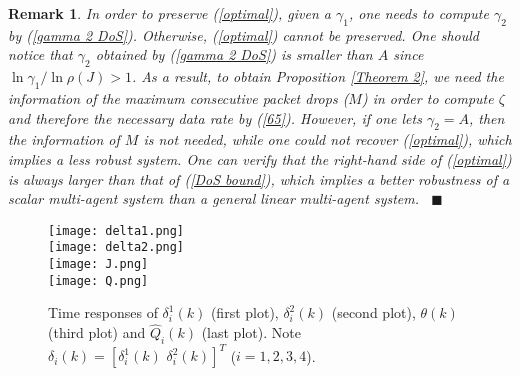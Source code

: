 \documentclass[letterpaper,journal,final,twocolumn]{IEEEtran}
\def\qedp{\hspace*{\fill}~{\tiny $\blacksquare$}}
\newtheorem{itremark}{Remark}
\newenvironment{remark}{\begin{itremark}\rm}{\end{itremark}}
\begin{document}
\begin{remark}\label{remark 3}
In order to preserve (\ref{optimal}), given a $\gamma_1$, one needs to compute $\gamma_2$ by (\ref{gamma 2 DoS}). Otherwise, (\ref{optimal}) cannot be preserved. One should notice that $\gamma_2$ obtained by (\ref{gamma 2 DoS}) is smaller than $A$ since $\ln \gamma_1/ \ln \rho(J)>1$. As a result, to obtain Proposition \ref{Theorem 2}, we need the information of the maximum consecutive packet drops ($M$) in order to compute $\zeta$ and therefore the necessary data rate by (\ref{65}). However, if one lets $\gamma_2=A$, then the information of $M$ is not needed, while one could not recover (\ref{optimal}), which implies a less robust system. 
One can verify that the right-hand side of (\ref{optimal}) is always larger than that of (\ref{DoS bound}), which implies a better robustness of a scalar multi-agent system than a general linear multi-agent system. 
\qedp
\end{remark}








\begin{figure}[t]
	\begin{center}
		\texttt{[image: delta1.png]}  \\
		\texttt{[image: delta2.png]}  \\
		\texttt{[image: J.png]}  \\
		\texttt{[image: Q.png]}  \\
		\vspace{-2mm}
		\linespread{1}\caption{Time responses of $\delta_i ^1 (k)$ (first plot), $\delta_i ^2 (k)$ (second plot), $\theta(k)$ (third plot) and $\hat Q _i (k)$ (last plot). Note $\delta_i(k)=[\delta_i^1(k) \,\, \delta_i^2(k)]^T$ ($i=1, 2, 3, 4$). }\label{simulation1}
	\end{center}
\vspace{-8mm}
\end{figure}
\end{document}

